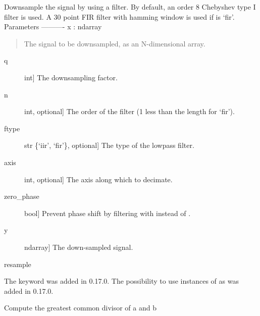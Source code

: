 \documentclass[letterpaper,10pt,english]{sphinxmanual}
\begin{document}
\begin{fulllineitems}
\label{signal_base:signal_base.decimate_ZP}
Downsample the signal by using a filter.
By default, an order 8 Chebyshev type I filter is used.  A 30 point FIR
filter with hamming window is used if  is `fir'.
Parameters
----------
x : ndarray
\begin{quote}

The signal to be downsampled, as an N-dimensional array.
\end{quote}
\begin{description}
\item[{q}] \leavevmode{[}int{]}
The downsampling factor.

\item[{n}] \leavevmode{[}int, optional{]}
The order of the filter (1 less than the length for `fir').

\item[{ftype}] \leavevmode{[}str \{`iir', `fir'\}, optional{]}
The type of the lowpass filter.

\item[{axis}] \leavevmode{[}int, optional{]}
The axis along which to decimate.

\item[{zero\_phase}] \leavevmode{[}bool{]}
Prevent phase shift by filtering with  instead of .

\end{description}
\begin{description}
\item[{y}] \leavevmode{[}ndarray{]}
The down-sampled signal.

\end{description}

resample

The  keyword was added in 0.17.0.
The possibility to use instances of  as  was added in 0.17.0.

\end{fulllineitems}


\begin{fulllineitems}
\label{signal_base:signal_base.gcd}
Compute the greatest common divisor of a and b

\end{fulllineitems}
\end{document}
